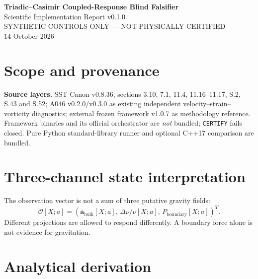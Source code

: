 \documentclass[10pt,a4paper]{article}
\newcommand{\nogo}{\textsf{NOT PHYSICALLY CERTIFIED}}
\begin{document}
\begin{center}
{\Large\bfseries Triadic--Casimir Coupled-Response Blind Falsifier}\\[3pt]
{\large Scientific Implementation Report v0.1.0}\\[8pt]
\textsf{SYNTHETIC CONTROLS ONLY --- \nogo}\\[4pt]
14 October 2026
\end{center}

\begin{abstract}
This release fuses the historical SST three-observable interpretation (bulk mechanics, clock/optics, and boundary stress) with incompressible Euler kinematics, a candidate gauge-covariant matter--link phase and a classical thermal scalar two-sheet model. It implements exactly three separately SHA-256-committed datasets. The calculations qualify analytic identities and software behavior only: no independent PKLSA-driven material response or zero-temperature Casimir force has been derived.
\end{abstract}

\section{Scope and provenance}
\textbf{Source layers.} SST Canon v0.8.36, sections 3.10, 7.1, 11.4, 11.16--11.17, S.2, S.43 and S.52; A046 v0.2.0/v0.3.0 as existing independent velocity--strain--vorticity diagnostics; external frozen framework v1.0.7 as methodology reference. Framework binaries and its official orchestrator are \emph{not} bundled; \texttt{CERTIFY} fails closed. Pure Python standard-library runner and optional C++17 comparison are bundled.

\section{Three-channel state interpretation}
The observation vector is not a sum of three putative gravity fields:
\begin{equation}
\mathcal O[X;a]=\left(\mathbf a_{\mathrm{bulk}}[X;a],\,\Delta\nu/\nu[X;a],\,P_{\mathrm{boundary}}[X;a]\right)^T.
\end{equation}
Different projections are allowed to respond differently. A boundary force alone is not evidence for gravitation.

\section{Analytical derivation}
\end{document}
